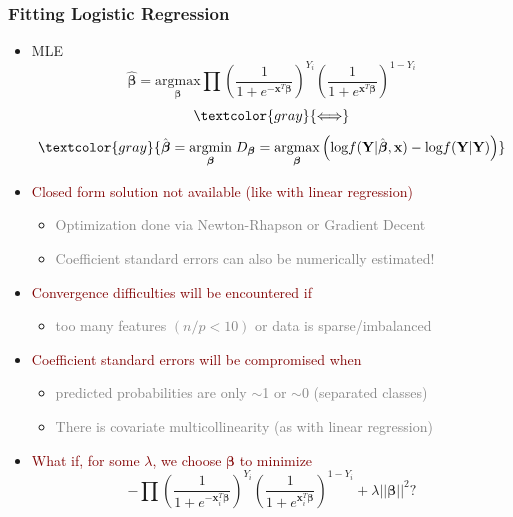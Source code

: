 \documentclass[xcolor={dvipsnames}]{beamer}
\begin{document}
\frame
{
\frametitle{Fitting Logistic Regression}

\begin{itemize}
\item MLE
$$\hat {\boldsymbol \beta} = \underset{{\boldsymbol \beta}}{\text{argmax}} \prod \left(\frac{1}{1+e^{-\boldsymbol x^T \boldsymbol \beta}}\right)^{Y_i} \left(\frac{1}{1+e^{\boldsymbol x^T \boldsymbol \beta}}\right)^{1-Y_i}$$
$$ \textcolor{gray}{\Longleftrightarrow}$$
$$ \textcolor{gray}{\hat {\boldsymbol \beta} = \underset{ {\boldsymbol \beta}}{\text{argmin}} \; D_{{\boldsymbol \beta}} = \underset{ {\boldsymbol \beta}}{\text{argmax}} \left( \text{log}f(\textbf{Y}|\hat {\boldsymbol \beta}, \textbf{x}) - \text{log}f(\textbf{Y}|\textbf{Y})\right)}$$

\item<2->  \textcolor{Maroon}{Closed form solution not available (like with linear regression)}
\begin{itemize}
\item \textcolor{gray}{Optimization done via Newton-Rhapson or Gradient Decent}
\item \textcolor{gray}{Coefficient standard errors can also be numerically estimated!}
\end{itemize}

\item<3->  \textcolor{Maroon}{Convergence difficulties will be encountered if }
\begin{itemize}
\item \textcolor{gray}{too many features $(n/p < 10)$ or data is sparse/imbalanced }
\end{itemize}

\item<4->  \textcolor{Maroon}{Coefficient standard errors will be compromised when }
\begin{itemize}
\item \textcolor{gray}{predicted probabilities are only $\sim$1 or $\sim$0 (separated classes)}
\item \textcolor{gray}{There is covariate multicollinearity (as with linear regression)}
\end{itemize}

\item<5->  \textcolor{Maroon}{What if, for some $\lambda$,  we choose ${\boldsymbol \beta}$ to minimize}
$$ -\prod \left(\frac{1}{1+e^{-\textbf{x}^T_i {\boldsymbol \beta}}}\right)^{Y_i} \left(\frac{1}{1+e^{\textbf{x}^T_i {\boldsymbol \beta}}}\right)^{1-Y_i} + \lambda ||{\boldsymbol \beta}||^2? $$

\end{itemize}
}
\end{document}
